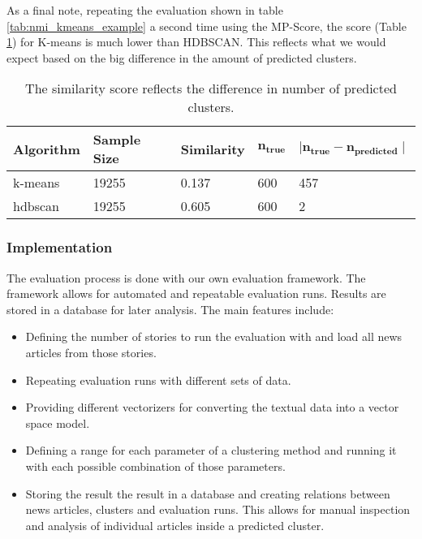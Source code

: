 As a final note, repeating the evaluation shown in table \ref{tab:nmi_kmeans_example} a second time using the MP-Score, the score (Table \ref{tab:avg_predict_kmeans_example}) for K-means is much lower than HDBSCAN. This reflects what we would expect based on the big difference in the amount of predicted clusters.

\begin{table}[h]
    \centering
    \begin{tabular}{|l|l|l|l|l|}
    \hline
    \textbf{Algorithm} & \textbf{Sample Size} & \textbf{Similarity}  & $\mathbf{n_{true}}$ & $\mathbf{ \mid n_{true} - n_{predicted} \mid }$ \\ \hline
    k-means & 19255 & 0.137 & 600 & 457 \\ \hline
    hdbscan & 19255 & 0.605 & 600 & 2 \\ \hline
    \end{tabular}
    \caption{The similarity score reflects the difference in number of predicted clusters.}
    \label{tab:avg_predict_kmeans_example}
\end{table}

\subsubsection{Implementation}
The evaluation process is done with our own evaluation framework.
The framework allows for automated and repeatable evaluation runs.
Results are stored in a database for later analysis.
The main features include:

\begin{itemize}
    \item Defining the number of stories to run the evaluation with and load all news articles from those stories.
    \item Repeating evaluation runs with different sets of data.
    \item Providing different vectorizers for converting the textual data into a vector space model.
    \item Defining a range for each parameter of a clustering method and running it with each possible combination of those parameters.
    \item Storing the result the result in a database and creating relations between news articles, clusters and evaluation runs. This allows for manual inspection and analysis of individual articles inside a predicted cluster.
\end{itemize}

